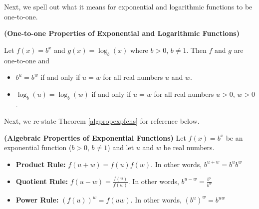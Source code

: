 \documentclass{ximera}
\begin{document}
Next, we spell out what it means for exponential and logarithmic functions to be one-to-one.




\begin{theorem}  \label{explogsonetoone} \textbf{(One-to-one Properties of Exponential and Logarithmic Functions)} 

Let $f(x) = b^{x}$ and $g(x) = \log_{b}(x)$ where $b>0$, $b\neq 1$.  Then $f$ and $g$ are one-to-one and  

\begin{itemize}

\item  $b^{u} = b^{w}$ if and only if $u=w$ for all real numbers $u$ and $w$.

\item  $\log_{b}(u) = \log_{b}(w)$ if and only if $u=w$ for all real numbers $u > 0$, $w > 0$.

\end{itemize}

\end{theorem}





Next, we re-state Theorem \ref{algpropexpfcns} for reference below.




\begin{theorem}  \textbf{(Algebraic Properties of Exponential Functions)}  Let $f(x) = b^{x}$ be an exponential function ($b > 0$, $b\neq 1$) and let $u$ and $w$ be real numbers. 

\begin{itemize}

\item  \textbf{Product Rule:}  $f(u+w) = f(u) f(w)$.  In other words, $b^{u+w} = b^{u} b^{w}$

\item  \textbf{Quotient Rule:}  $f(u-w) = \frac{f(u)}{f(w)}$.  In other words, $b^{u-w} = \frac{b^{u}}{b^{w}}$

\item  \textbf{Power Rule:}  $\left(f(u)\right)^w = f(uw)$.  In other words, $\left(b^{u}\right)^{w} = b^{uw}$

\end{itemize}

\end{theorem}
\end{document}
